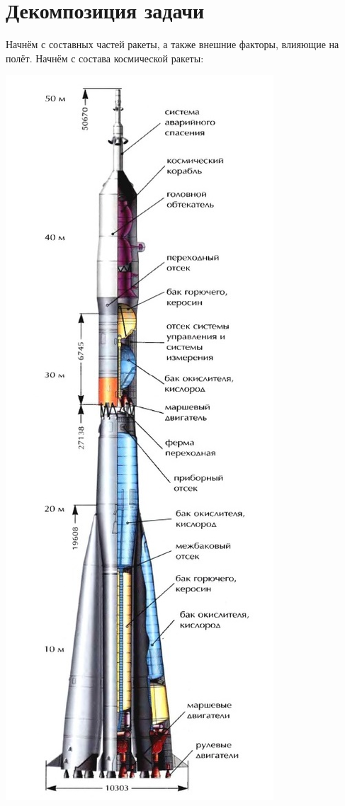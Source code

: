 \documentclass[a4paper, 12pt]{report}
\begin{document}
\section{Декомпозиция задачи}
\textrm{
    Начнём с составных частей ракеты, а также внешние факторы, влияющие на полёт. Начнём с состава космической ракеты:
}
\begin{flushright}
    \includegraphics[scale=0.6]{пример_космической_ракеты}
    \label{Рис. 1. Состав космической ракеты}
\end{flushright}
\end{document}
